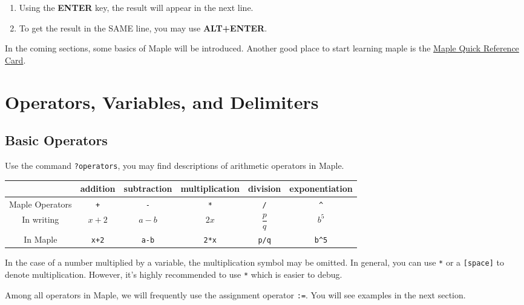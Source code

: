 \documentclass[
  12pt]{elegantbook}
\begin{document}
\begin{enumerate}
\def\labelenumi{\arabic{enumi}.}
\item
  Using the \textbf{ENTER} key, the result will appear in the next line.
\item
  To get the result in the SAME line, you may use \textbf{ALT+ENTER}.
\end{enumerate}

In the coming sections, some basics of Maple will be introduced. Another good place to start learning maple is the \href{https://www.maplesoft.com/support/help/Maple/view.aspx?path=worksheet/help/usingquickreference\&cid=36}{Maple Quick Reference Card}.

\hypertarget{operators-variables-and-delimiters}{%
\section{Operators, Variables, and Delimiters}\label{operators-variables-and-delimiters}}

\hypertarget{basic-operators}{%
\subsection{Basic Operators}\label{basic-operators}}

Use the command \texttt{?operators}, you may find descriptions of arithmetic operators in Maple.

\begin{longtable}[]{@{}cccccc@{}}
\toprule
& addition & subtraction & multiplication & division & exponentiation \\
\midrule
\endhead
Maple Operators & \texttt{+} & \texttt{-} & \texttt{*} & \texttt{/} & \texttt{\^{}} \\
In writing & \(x+2\) & \(a-b\) & \(2x\) & \(\dfrac pq\) & \(b^5\) \\
In Maple & \texttt{x+2} & \texttt{a-b} & \texttt{2*x} & \texttt{p/q} & \texttt{b\^{}5} \\
\bottomrule
\end{longtable}

In the case of a number multiplied by a variable, the multiplication symbol may be omitted. In general, you can use \texttt{*} or a \texttt{{[}space{]}} to denote multiplication. However, it's highly recommended to use \texttt{*} which is easier to debug.

Among all operators in Maple, we will frequently use the assignment operator \texttt{:=}. You will see examples in the next section.
\end{document}
